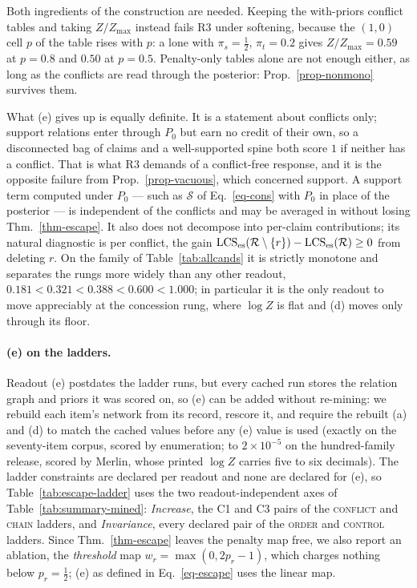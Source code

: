 Both ingredients of the construction are needed. Keeping the with-priors conflict tables and taking
$Z/Z_{\max}$ instead fails R3 under softening, because the $(1,0)$ cell $p$ of the \con{} table rises
with $p$: a lone \con{} with $\pi_s=\tfrac12$, $\pi_t=0.2$ gives $Z/Z_{\max}=0.59$ at $p=0.8$ and
$0.50$ at $p=0.5$. Penalty-only tables alone are not enough either, as long as the conflicts are read
through the posterior: Prop.~\ref{prop-nonmono} survives them.

What (e) gives up is equally definite. It is a statement about conflicts only; support relations
enter through $P_0$ but earn no credit of their own, so a disconnected bag of claims and a
well-supported spine both score $1$ if neither has a conflict. That is what R3 demands of a
conflict-free response, and it is the opposite failure from Prop.~\ref{prop-vacuous}, which
concerned support. A support term computed under $P_0$ --- such as $\mathcal{S}$ of
Eq.~\ref{eq-cons} with $P_0$ in place of the posterior --- is independent of the conflicts and may be
averaged in without losing Thm.~\ref{thm-escape}. It also does not decompose into per-claim
contributions; its natural diagnostic is per conflict, the gain
$\mathrm{LCS}_{\mathrm{es}}(\mathcal{R}\setminus\{r\})-\mathrm{LCS}_{\mathrm{es}}(\mathcal{R})\ge0$ from deleting $r$. On the
family of Table~\ref{tab:allcands} it is strictly monotone and separates the rungs more widely than
any other readout, $0.181 < 0.321 < 0.388 < 0.600 < 1.000$; in particular it is the only readout
to move appreciably at the concession rung, where $\log Z$ is flat and (d) moves only through its
floor.

\paragraph{(e) on the ladders.} Readout (e) postdates the ladder runs, but every cached run stores
the relation graph and priors it was scored on, so (e) can be added without re-mining: we rebuild
each item's network from its record, rescore it, and require the rebuilt (a) and (d) to match the
cached values before any (e) value is used (exactly on the seventy-item corpus, scored by
enumeration; to $2\times10^{-5}$ on the hundred-family release, scored by Merlin, whose printed
$\log Z$ carries five to six decimals). The ladder constraints are declared per readout and none
are declared for (e), so Table~\ref{tab:escape-ladder} uses the two readout-independent axes of
Table~\ref{tab:summary-mined}: \emph{Increase}, the C1 and C3 pairs of the \textsc{conflict} and
\textsc{chain} ladders, and \emph{Invariance}, every declared pair of the \textsc{order} and
\textsc{control} ladders. Since Thm.~\ref{thm-escape} leaves the penalty map free, we also report
an ablation, the \emph{threshold} map $w_r=\max(0,2p_r-1)$, which charges nothing below
$p_r=\tfrac12$; (e) as defined in Eq.~\ref{eq-escape} uses the linear map.

